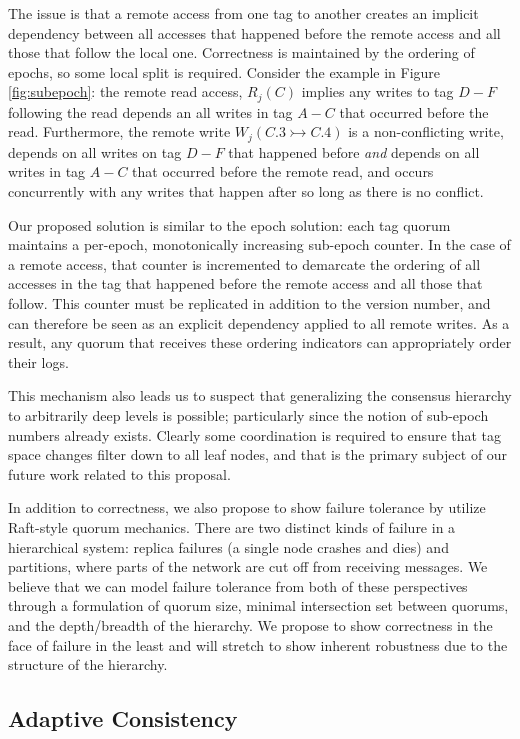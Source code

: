\documentclass{article}
\begin{document}
The issue is that a remote access from one tag to another creates an implicit dependency between all accesses that happened before the remote access and all those that follow the local one. Correctness is maintained by the ordering of epochs, so some local split is required. Consider the example in Figure \ref{fig:subepoch}: the remote read access, $R_j(C)$ implies any writes to tag $D-F$ following the read depends an all writes in tag $A-C$ that occurred before the read. Furthermore, the remote write $W_j(C.3 \rightarrowtail C.4)$ is a non-conflicting write, depends on all writes on tag $D-F$ that happened before \textit{and} depends on all writes in tag $A-C$ that occurred before the remote read, and occurs concurrently with any writes that happen after so long as there is no conflict.

Our proposed solution is similar to the epoch solution: each tag quorum maintains a per-epoch, monotonically increasing sub-epoch counter. In the case of a remote access, that counter is incremented to demarcate the ordering of all accesses in the tag that happened before the remote access and all those that follow. This counter must be replicated in addition to the version number, and can therefore be seen as an explicit dependency applied to all remote writes. As a result, any quorum that receives these ordering indicators can appropriately order their logs.

This mechanism also leads us to suspect that generalizing the consensus hierarchy to arbitrarily deep levels is possible; particularly since the notion of sub-epoch numbers already exists. Clearly some coordination is required to ensure that tag space changes filter down to all leaf nodes, and that is the primary subject of our future work related to this proposal.

In addition to correctness, we also propose to show failure tolerance by utilize Raft-style quorum mechanics. There are two distinct kinds of failure in a hierarchical system: replica failures (a single node crashes and dies) and partitions, where parts of the network are cut off from receiving messages. We believe that we can model failure tolerance from both of these perspectives through a formulation of quorum size, minimal intersection set between quorums, and the depth/breadth of the hierarchy. We propose to show correctness in the face of failure in the least and will stretch to show inherent robustness due to the structure of the hierarchy.

\subsection{Adaptive Consistency}
\end{document}
